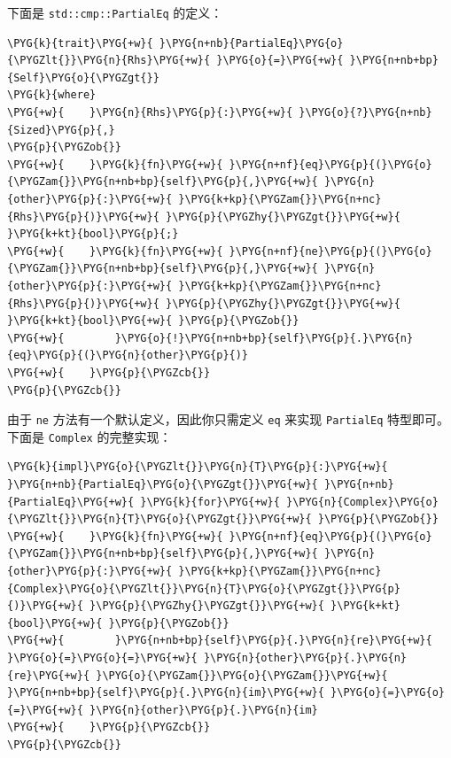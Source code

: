 下面是 \texttt{std::cmp::PartialEq} 的定义：

\begin{Verbatim}[commandchars=\\\{\},breaklines=true,breakanywhere=true,fontsize=\codefont,xleftmargin=17bp]
\PYG{k}{trait}\PYG{+w}{ }\PYG{n+nb}{PartialEq}\PYG{o}{\PYGZlt{}}\PYG{n}{Rhs}\PYG{+w}{ }\PYG{o}{=}\PYG{+w}{ }\PYG{n+nb+bp}{Self}\PYG{o}{\PYGZgt{}}
\PYG{k}{where}
\PYG{+w}{    }\PYG{n}{Rhs}\PYG{p}{:}\PYG{+w}{ }\PYG{o}{?}\PYG{n+nb}{Sized}\PYG{p}{,}
\PYG{p}{\PYGZob{}}
\PYG{+w}{    }\PYG{k}{fn}\PYG{+w}{ }\PYG{n+nf}{eq}\PYG{p}{(}\PYG{o}{\PYGZam{}}\PYG{n+nb+bp}{self}\PYG{p}{,}\PYG{+w}{ }\PYG{n}{other}\PYG{p}{:}\PYG{+w}{ }\PYG{k+kp}{\PYGZam{}}\PYG{n+nc}{Rhs}\PYG{p}{)}\PYG{+w}{ }\PYG{p}{\PYGZhy{}\PYGZgt{}}\PYG{+w}{ }\PYG{k+kt}{bool}\PYG{p}{;}
\PYG{+w}{    }\PYG{k}{fn}\PYG{+w}{ }\PYG{n+nf}{ne}\PYG{p}{(}\PYG{o}{\PYGZam{}}\PYG{n+nb+bp}{self}\PYG{p}{,}\PYG{+w}{ }\PYG{n}{other}\PYG{p}{:}\PYG{+w}{ }\PYG{k+kp}{\PYGZam{}}\PYG{n+nc}{Rhs}\PYG{p}{)}\PYG{+w}{ }\PYG{p}{\PYGZhy{}\PYGZgt{}}\PYG{+w}{ }\PYG{k+kt}{bool}\PYG{+w}{ }\PYG{p}{\PYGZob{}}
\PYG{+w}{        }\PYG{o}{!}\PYG{n+nb+bp}{self}\PYG{p}{.}\PYG{n}{eq}\PYG{p}{(}\PYG{n}{other}\PYG{p}{)}
\PYG{+w}{    }\PYG{p}{\PYGZcb{}}
\PYG{p}{\PYGZcb{}}
\end{Verbatim}

由于 \texttt{ne} 方法有一个默认定义，因此你只需定义 \texttt{eq} 来实现 \texttt{PartialEq} 特型即可。下面是 \texttt{Complex} 的完整实现：

\begin{Verbatim}[commandchars=\\\{\},breaklines=true,breakanywhere=true,fontsize=\codefont,xleftmargin=17bp]
\PYG{k}{impl}\PYG{o}{\PYGZlt{}}\PYG{n}{T}\PYG{p}{:}\PYG{+w}{ }\PYG{n+nb}{PartialEq}\PYG{o}{\PYGZgt{}}\PYG{+w}{ }\PYG{n+nb}{PartialEq}\PYG{+w}{ }\PYG{k}{for}\PYG{+w}{ }\PYG{n}{Complex}\PYG{o}{\PYGZlt{}}\PYG{n}{T}\PYG{o}{\PYGZgt{}}\PYG{+w}{ }\PYG{p}{\PYGZob{}}
\PYG{+w}{    }\PYG{k}{fn}\PYG{+w}{ }\PYG{n+nf}{eq}\PYG{p}{(}\PYG{o}{\PYGZam{}}\PYG{n+nb+bp}{self}\PYG{p}{,}\PYG{+w}{ }\PYG{n}{other}\PYG{p}{:}\PYG{+w}{ }\PYG{k+kp}{\PYGZam{}}\PYG{n+nc}{Complex}\PYG{o}{\PYGZlt{}}\PYG{n}{T}\PYG{o}{\PYGZgt{}}\PYG{p}{)}\PYG{+w}{ }\PYG{p}{\PYGZhy{}\PYGZgt{}}\PYG{+w}{ }\PYG{k+kt}{bool}\PYG{+w}{ }\PYG{p}{\PYGZob{}}
\PYG{+w}{        }\PYG{n+nb+bp}{self}\PYG{p}{.}\PYG{n}{re}\PYG{+w}{ }\PYG{o}{=}\PYG{o}{=}\PYG{+w}{ }\PYG{n}{other}\PYG{p}{.}\PYG{n}{re}\PYG{+w}{ }\PYG{o}{\PYGZam{}}\PYG{o}{\PYGZam{}}\PYG{+w}{ }\PYG{n+nb+bp}{self}\PYG{p}{.}\PYG{n}{im}\PYG{+w}{ }\PYG{o}{=}\PYG{o}{=}\PYG{+w}{ }\PYG{n}{other}\PYG{p}{.}\PYG{n}{im}
\PYG{+w}{    }\PYG{p}{\PYGZcb{}}
\PYG{p}{\PYGZcb{}}
\end{Verbatim}

